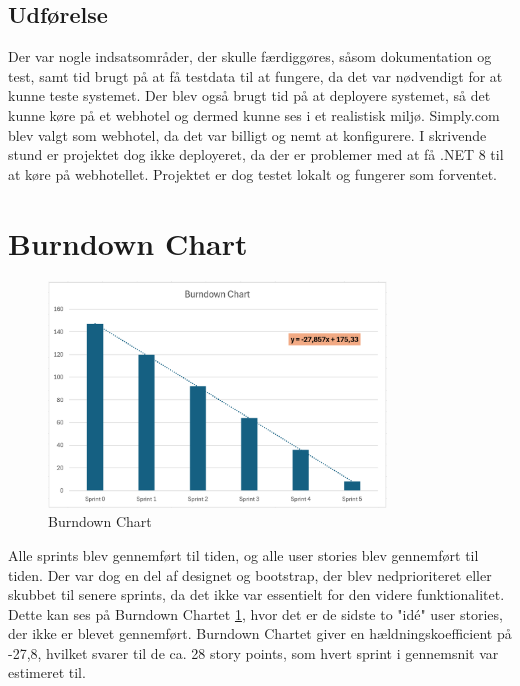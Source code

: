 \subsection{Udførelse}
\label{subsec:sprint-6-udforelse}
Der var nogle indsatsområder, der skulle færdiggøres, såsom dokumentation og test, samt tid brugt på at få testdata til at fungere, da det var nødvendigt for at kunne teste systemet.
Der blev også brugt tid på at deployere systemet, så det kunne køre på et webhotel og dermed kunne ses i et realistisk miljø. 
Simply.com blev valgt som webhotel, da det var billigt og nemt at konfigurere. 
I skrivende stund er projektet dog ikke deployeret, da der er problemer med at få .NET 8 til at køre på webhotellet. Projektet er dog testet lokalt og fungerer som forventet.

\section{Burndown Chart}
\label{sec:burndown-chart}
\begin{figure}[H]
    \centering
    \includegraphics[width=0.8\textwidth]{figures/scrum/burndown-chart.png}
    \caption{Burndown Chart}
    \label{fig:burndown-chart}
\end{figure}

Alle sprints blev gennemført til tiden, og alle user stories blev gennemført til tiden. 
Der var dog en del af designet og bootstrap, der blev nedprioriteret eller skubbet til senere sprints, da det ikke var essentielt for den videre funktionalitet. 
Dette kan ses på Burndown Chartet \cref{fig:burndown-chart}, hvor det er de sidste to "idé" user stories, der ikke er blevet gennemført.
Burndown Chartet giver en hældningskoefficient på -27,8, hvilket svarer til de ca. 28 story points, som hvert sprint i gennemsnit var estimeret til.

